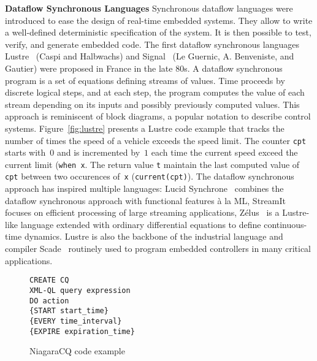 \textbf{Dataflow Synchronous Languages}
Synchronous dataflow languages were introduced to ease the design of
real-time embedded systems. They allow to write a well-defined
deterministic specification of the system. It is then possible to
test, verify, and generate embedded code.
The first dataflow synchronous languages Lustre~\cite{lustre_1987}
(Caspi and Halbwachs) and Signal~\cite{signal_1991} (Le Guernic,
A. Benveniste, and Gautier) were proposed in France in the late 80s.
A dataflow synchronous program is a set of equations defining streams
of values. Time proceeds by discrete logical steps, and at each step,
the program computes the value of each stream depending on its inputs
and possibly previously computed values.
This approach is reminiscent of block diagrams, a popular notation to
describe control systems.
Figure~\ref{fig:lustre} presents a Lustre code example that tracks the
number of times the speed of a vehicle exceeds the speed limit. The
counter \lstinline{cpt} starts with~$0$ and is incremented by~$1$ each
time the current speed exceed the current limit (\lstinline{when x}.
The return value \lstinline{t} maintain the last computed value
of \lstinline{cpt} between two occurences of~\lstinline{x}
(\lstinline{current(cpt)}).
The dataflow synchronous approach has inspired
multiple languages: Lucid Synchrone~\cite{lucid_2006} combines the
dataflow synchronous approach with functional features \`a la ML,
StreamIt~\cite{streamit_2002} focuses on efficient processing of large
streaming applications, Z\'elus~\cite{zelus_2013} is a Lustre-like
language extended with ordinary differential equations to define
continuous-time dynamics. Lustre is also the backbone of the
industrial language and compiler Scade~\cite{scade_2017} routinely
used to program embedded controllers in many critical applications.


\begin{figure}
\begin{lstlisting}
CREATE CQ
XML-QL query expression
DO action
{START start_time}
{EVERY time_interval}
{EXPIRE expiration_time}
\end{lstlisting}
\caption{\label{fig:Niagra}NiagaraCQ code example}
\end{figure}

